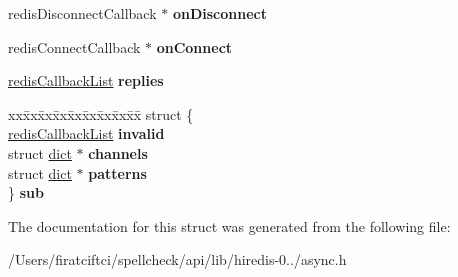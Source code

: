 \begin{DoxyCompactItemize}
\begin{tabbing}
\end{tabbing}\item 
\mbox{\label{structredis_async_context_a3abb6dd544cd420a5fbe8ade6804a2f9}} 
redis\+Disconnect\+Callback $\ast$ {\bfseries on\+Disconnect}
\item 
\mbox{\label{structredis_async_context_a3dc5b4a36a035586e27fd22e5b831da0}} 
redis\+Connect\+Callback $\ast$ {\bfseries on\+Connect}
\item 
\mbox{\label{structredis_async_context_afa8e9602732ae9746b749db0c0eb366f}} 
\mbox{\hyperlink{structredis_callback_list}{redis\+Callback\+List}} {\bfseries replies}
\item 
\mbox{\label{structredis_async_context_aa9151c064088d88cc69410a9e33f93f4}} 
\begin{tabbing}
xx\=xx\=xx\=xx\=xx\=xx\=xx\=xx\=xx\=\kill
struct \{\\
\>\mbox{\hyperlink{structredis_callback_list}{redisCallbackList}} {\bfseries invalid}\\
\>struct \mbox{\hyperlink{structdict}{dict}} $\ast$ {\bfseries channels}\\
\>struct \mbox{\hyperlink{structdict}{dict}} $\ast$ {\bfseries patterns}\\
\} {\bfseries sub}\\

\end{tabbing}\end{DoxyCompactItemize}


The documentation for this struct was generated from the following file\+:\begin{DoxyCompactItemize}
\item 
/\+Users/firatciftci/spellcheck/api/lib/hiredis-\/0../async.\+h\end{DoxyCompactItemize}
